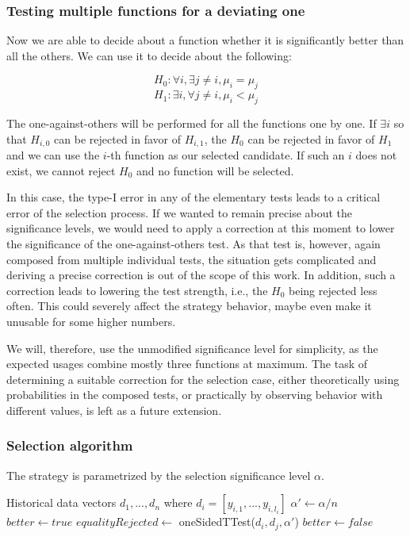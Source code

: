 \subsubsection{Testing multiple functions for a deviating one}

Now we are able to decide about a function whether it is significantly better than all the others. We can use it to decide about the following:

\[
H_0: \forall i, \exists j \neq i, \mu_i = \mu_j
\]
\[
H_1: \exists i, \forall j \neq i, \mu_i < \mu_j
\]

The one-against-others will be performed for all the functions one by one. If $\exists i$ so that $H_{i,0}$ can be rejected in favor of $H_{i, 1}$, the $H_0$ can be rejected in favor of $H_1$ and we can use the $i$-th function as our selected candidate. If such an $i$ does not exist, we cannot reject $H_0$ and no function will be selected.

 In this case, the type-I error in any of the elementary tests leads to a critical error of the selection process. If we wanted to remain precise about the significance levels, we would need to apply a correction at this moment to lower the significance of the one-against-others test. As that test is, however, again composed from multiple individual tests, the situation gets complicated and deriving a precise correction is out of the scope of this work. In addition, such a correction leads to lowering the test strength, i.e., the $H_0$ being rejected less often. This could severely affect the strategy behavior, maybe even make it unusable for some higher numbers.
 
 We will, therefore, use the unmodified significance level for simplicity, as the expected usages combine mostly three functions at maximum. The task of determining a suitable correction for the selection case, either theoretically using probabilities in the composed tests, or practically by observing behavior with different values, is left as a future extension.

\subsubsection{Selection algorithm}

The strategy is parametrized by the selection significance level $\alpha$.

\begin{algorithmic}[1] %
	\INPUT Historical data vectors $d_1,...,d_n$ where $d_i = [y_{i,1},...,y_{i,l_i}]$
	\State$\alpha' \gets \alpha / n$
		\State $better \gets true$
			\State $equalityRejected \gets$ oneSidedTTest($d_i, d_j, \alpha'$)
				\State $better \gets false$
			\EndIf
		\EndFor
			\State {}
		\EndIf
	\EndFor
	\State {}
	
\end{algorithmic}

